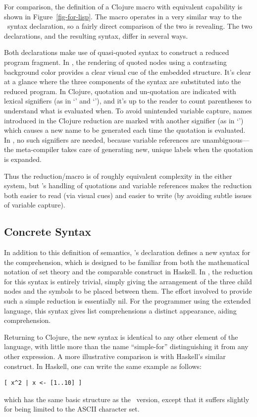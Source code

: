 For comparison, the definition of a Clojure macro with equivalent capability is shown in Figure~\ref{fig-for-lisp}. The macro operates in a very similar way to the \Meta\ syntax declaration, so a fairly direct comparison of the two is revealing. The two declarations, and the resulting syntax, differ in several ways.

Both declarations make use of quasi-quoted syntax to construct a reduced program fragment. In \Meta, the rendering of quoted nodes using a contrasting background color provides a clear visual cue of the embedded structure. It's clear at a glance where the three components of the syntax are substituted into the reduced program. In Clojure, quotation and un-quotation are indicated with lexical signifiers (as in `' and `'), and it's up to the reader to count parentheses to understand what is evaluated when. To avoid unintended variable capture, names introduced in the Clojure reduction are marked with another signifier (as in `') which causes a new name to be generated each time the quotation is evaluated. In \Meta, no such signifiers are needed, because variable references are unambiguous---the meta-compiler takes care of generating new, unique labels when the quotation is expanded.

Thus the reduction/macro is of roughly equivalent complexity in the either system, but \Meta's handling of quotations and variable references makes the reduction both easier to read (via visual cues) and easier to write (by avoiding subtle issues of variable capture).

\subsection{Concrete Syntax}
In addition to this definition of semantics, \Meta's declaration defines a new syntax for the comprehension, which is designed to be familiar from both the mathematical notation of set theory and the comparable construct in Haskell. In \Meta, the reduction for this syntax is entirely trivial, simply giving the arrangement of the three child nodes and the symbols to be placed between them. The effort involved to provide such a simple reduction is essentially nil. For the programmer using the extended language, this syntax gives list comprehensions a distinct appearance, aiding comprehension. 

Returning to Clojure, the new syntax is identical to any other element of the language, with little more than the name ``simple-for'' distinguishing it from any other expression. A more illustrative comparison is with Haskell's similar construct. In Haskell, one can write the same example as follows:
\begin{verbatim}
[ x^2 | x <- [1..10] ]
\end{verbatim}
which has the same basic structure as the \Meta\ version, except that it suffers slightly for being limited to the ASCII character set.

